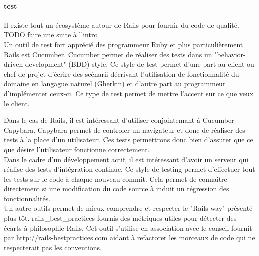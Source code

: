 \paragraph{test}
Il existe tout un écosystème autour de Rails pour fournir du code de qualité. TODO faire une suite à l'intro\\

Un outil de test fort apprécié des programmeur Ruby et plus particulièrement Rails est Cucumber. Cucumber permet de réaliser des tests dans un "behavior-driven development" (BDD) style. Ce style de test permet d'une part au client ou chef de projet d'écrire des scénarii décrivant l'utilisation de fonctionnalité du domaine en langague naturel (Gherkin) et d'autre part au programmeur d'implémenter ceux-ci. Ce type de test permet de mettre l'accent sur ce que veux le client.

Dans le cas de Rails, il est intéressant d'utiliser conjointemant à Cucumber Capybara. Capybara permet de controler un navigateur et donc de réaliser des tests à la place d'un utilisateur. Ces tests permettrons donc bien d'assurer que ce que désire l'utilisateur fonctionne correctement.\\

Dans le cadre d'un développement actif, il est intéressant d'avoir un serveur qui réalise des tests d'intégration continue. Ce style de testing permet d'effectuer tout les tests sur le code à chaque nouveau commit. Cela permet de connaitre directement si une modification du code source à induit un régression des fonctionnalités.\\

Un autre outils permet de mieux comprendre et respecter le "Rails way" présenté plus tôt. rails\_best\_practices fournis des métriques utiles pour détecter des écarts à philosophie Rails. Cet outil s'utilise en association avec le conseil fournit par \url{http://rails-bestpractices.com} aidant à refactorer les morceaux de code qui ne respecterait pas les conventions.
